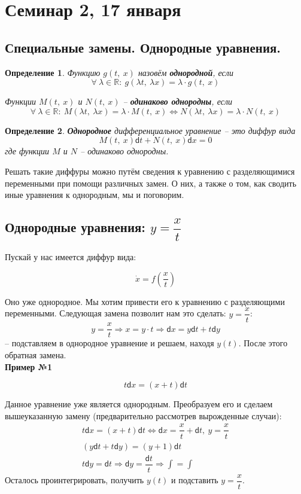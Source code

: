 \documentclass[a4paper,12pt]{article}
\newtheorem{definition}{Определение}
\newcommand{\R}{\mathbb{R}}
\renewcommand{\d}{\mathsf{d}}
\newcommand{\dx}{\dot{x}}
\newcommand{\ds}{\displaystyle}
\begin{document}
\newpage
\section{Семинар 2, 17 января}

\subsection{Специальные замены. Однородные уравнения.}

\begin{definition}
	Функцию $g(t,\ x)$ назовём \textbf{однородной}, если
	\[\forall\ \lambda \in \R:\ g(\lambda t,\ \lambda x) = \lambda \cdot g(t,\ x)\]
	
	Функции $M(t,\ x)$ и $N(t,\ x)$ -- \textbf{одинаково однородны}, если 
	\[\forall\ \lambda \in \R:\ M(\lambda t,\ \lambda x) = \lambda \cdot M(t,\ x) \iff N(\lambda t,\ \lambda x) = \lambda \cdot N(t,\ x)\]
\end{definition}
\begin{definition}
	\textbf{Однородное} дифференциальное уравнение -- это диффур вида
	\[M(t,\ x) \d t + N(t,\ x)\d x = 0\] где функции $M$ и $N$ -- одинаково однородны.
\end{definition}

Решать такие диффуры можно путём сведения к уравнению с разделяющимися переменными при помощи различных замен. О них, а также о том, как сводить иные уравнения к однородным, мы и поговорим.

\subsection{Однородные уравнения: $y = \dfrac{x}{t}$}

Пускай у нас имеется диффур вида:

\[\dx = f\left(\dfrac{x}{t}\right)\]

Оно уже однородное. Мы хотим привести его к уравнению с разделяющими переменными. Следующая замена позволит нам это сделать: $y = \dfrac{x}{t}$:
\[y = \dfrac{x}{t} \Longrightarrow x = y\cdot t \Longrightarrow \d x = y\d t + t \d y\] -- подставляем в однородное уравнение и решаем, находя $y(t)$. После этого обратная замена.
\ \\

\textbf{Пример №1}

\[t \d x = (x + t) \d t\]

Данное уравнение уже является однородным. Преобразуем его и сделаем вышеуказанную замену (предварительно рассмотрев вырожденные случаи):
\begin{gather*}
	t \d x = (x + t) \d t \iff \d x = \dfrac{x}{t} + \d t,\ y = \dfrac{x}{t}\\
	(y\d t + t \d y) = (y + 1)\d t\\
	t\d y = \d t \Longrightarrow \d y = \dfrac{\d t}{t} \Longrightarrow \ds\int=\int
\end{gather*}
Осталось проинтегрировать, получить $y(t)$ и подставить $y = \dfrac{x}{t}$.
\ \\
\end{document}
